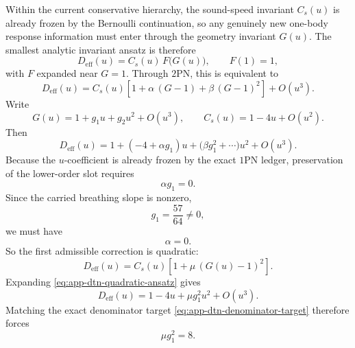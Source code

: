\documentclass[11pt]{article}
\newcommand{\OnePN}{\mathrm{1PN}}
\newcommand{\TwoPN}{\mathrm{2PN}}
\begin{document}
Within the current conservative hierarchy, the sound-speed invariant \(C_s(u)\) is
already frozen by the Bernoulli continuation, so any genuinely new one-body response
information must enter through the geometry invariant \(G(u)\).  The smallest analytic
invariant ansatz is therefore
\begin{equation}
D_{\mathrm{eff}}(u)=C_s(u)\,F\bigl(G(u)\bigr),
\qquad
F(1)=1,
\label{eq:app-dtn-general-F}
\end{equation}
with \(F\) expanded near \(G=1\).  Through \(\TwoPN\), this is equivalent to
\begin{equation}
D_{\mathrm{eff}}(u)=C_s(u)\left[1+\alpha\,(G-1)+\beta\,(G-1)^2\right]+O(u^3).
\label{eq:app-dtn-general-ansatz}
\end{equation}
Write
\begin{equation}
G(u)=1+g_1u+g_2u^2+O(u^3),
\qquad
C_s(u)=1-4u+O(u^2).
\label{eq:app-dtn-G-generic-series}
\end{equation}
Then
\begin{equation}
D_{\mathrm{eff}}(u)=1+(-4+\alpha g_1)u+\bigl(\beta g_1^2+\cdots\bigr)u^2+O(u^3).
\label{eq:app-dtn-ansatz-expanded}
\end{equation}
Because the \(u\)-coefficient is already frozen by the exact \(\OnePN\) ledger,
preservation of the lower-order slot requires
\begin{equation}
\alpha g_1=0.
\label{eq:app-dtn-alpha-condition}
\end{equation}
Since the carried breathing slope is nonzero,
\begin{equation}
g_1=\frac{57}{64}\neq 0,
\label{eq:app-dtn-g1-nonzero}
\end{equation}
we must have
\begin{equation}
\alpha=0.
\label{eq:app-dtn-alpha-zero}
\end{equation}
So the first admissible correction is quadratic:
\begin{equation}
D_{\mathrm{eff}}(u)=C_s(u)\left[1+\mu\,(G(u)-1)^2\right].
\label{eq:app-dtn-quadratic-ansatz}
\end{equation}
Expanding \cref{eq:app-dtn-quadratic-ansatz} gives
\begin{equation}
D_{\mathrm{eff}}(u)=1-4u+\mu g_1^2u^2+O(u^3).
\label{eq:app-dtn-quadratic-expanded}
\end{equation}
Matching the exact denominator target \cref{eq:app-dtn-denominator-target} therefore
forces
\begin{equation}
\mu g_1^2=8.
\label{eq:app-dtn-mu-equation}
\end{equation}
\end{document}
